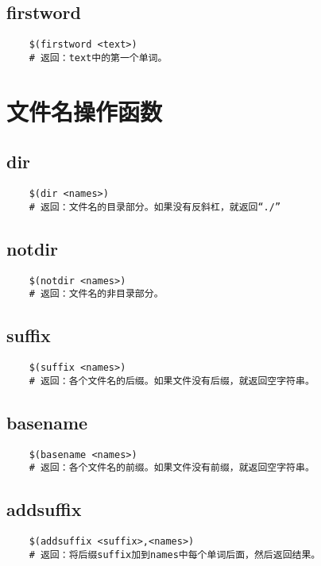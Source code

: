 \documentclass[a4paper,left=2.5cm,right=2.5cm,11pt]{article}
\begin{document}
\subsection{firstword}
	\begin{lstlisting}
	$(firstword <text>)
	# 返回：text中的第一个单词。
	\end{lstlisting}

\section{文件名操作函数}
\subsection{dir}
	\begin{lstlisting}
	$(dir <names>)
	# 返回：文件名的目录部分。如果没有反斜杠，就返回“./”
	\end{lstlisting}

\subsection{notdir}
	\begin{lstlisting}
	$(notdir <names>)
	# 返回：文件名的非目录部分。
	\end{lstlisting}

\subsection{suffix}
	\begin{lstlisting}
	$(suffix <names>)
	# 返回：各个文件名的后缀。如果文件没有后缀，就返回空字符串。
	\end{lstlisting}

\subsection{basename}
	\begin{lstlisting}
	$(basename <names>)
	# 返回：各个文件名的前缀。如果文件没有前缀，就返回空字符串。
	\end{lstlisting}

\subsection{addsuffix}
	\begin{lstlisting}
	$(addsuffix <suffix>,<names>)
	# 返回：将后缀suffix加到names中每个单词后面，然后返回结果。
	\end{lstlisting}
\end{document}
